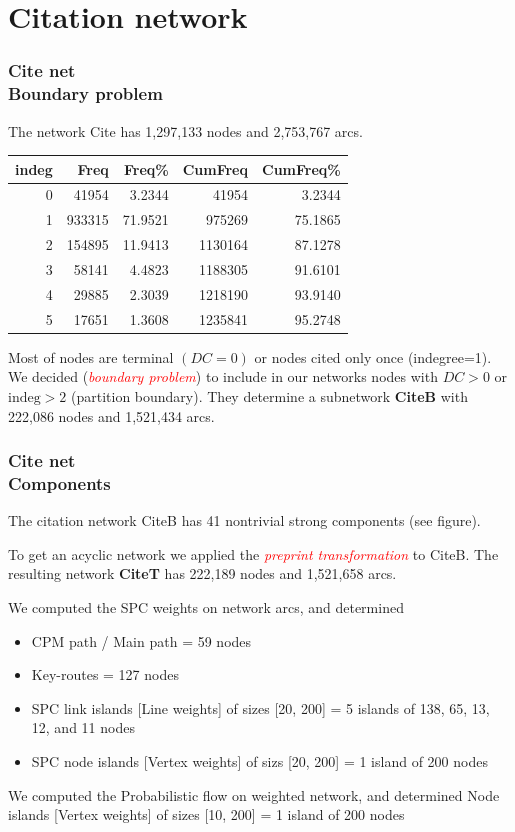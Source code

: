 \documentclass[hyperref={pdfstartview={FitBH -32768},
                         pdfpagemode=FullScreen,
                         plainpages=false,
                         colorlinks=true}
              ]{beamer}
\newcommand{\keyw}[1]{\textcolor{red}{\emph{#1}}}
\newcommand{\indeg}{\mbox{indeg}}
\begin{document}
\section{Citation network}  
\begin{frame}[fragile]
\frametitle{Cite net \\ \normalsize Boundary problem}
\small 

The network Cite has 1,297,133  nodes and 2,753,767 arcs.
\medskip

\footnotesize
\begin{center}
\begin{tabular}{|r|r|r|r|r|}
 indeg &       Freq &    Freq\%  &  CumFreq &  CumFreq\% \\ \hline
 0     & 41954   &  3.2344     & 41954   &  3.2344  \\ 
1   &  933315  &  71.9521   &  975269  & 75.1865  \\
2   &  154895   & 11.9413   & 1130164  &  87.1278 \\ \hline
3   &  58141    & 4.4823   & 1188305   & 91.6101  \\ 
4   &  29885   & 2.3039  & 1218190  & 93.9140 \\  
5   &  17651   & 1.3608   & 1235841  & 95.2748  \\ \hline
\end{tabular}
\end{center}

\medskip

Most of nodes are terminal $(DC=0)$ or nodes cited only once (indegree=1). We decided (\keyw{boundary problem}) to include in our networks nodes with $DC > 0$ or $\indeg > 2$ (partition boundary). They determine a subnetwork \textbf{CiteB} with  222,086 nodes and 1,521,434 arcs.

\end{frame}

\begin{frame}[fragile]
\frametitle{Cite net \\ \normalsize Components}
\small
The citation network CiteB has 41 nontrivial strong components (see figure).
 
To get an acyclic network we applied the \keyw{preprint transformation} to CiteB. The resulting network \textbf{CiteT} has 222,189 nodes and 1,521,658 arcs. 

We computed the SPC weights on network arcs, and determined 
\begin{itemize}
\item CPM path / Main path = 59 nodes
\item Key-routes = 127 nodes  
\item SPC link islands [Line weights] of sizes [20, 200] = 5 islands of 138, 65, 13, 12, and 11 nodes  
\item SPC node islands [Vertex weights] of sizs  [20, 200] = 1 island of 200 nodes 
\end{itemize}
We computed the Probabilistic flow on weighted network, and determined Node islands [Vertex weights] of sizes [10, 200] = 1 island of 200 nodes

\end{frame}
\end{document}
